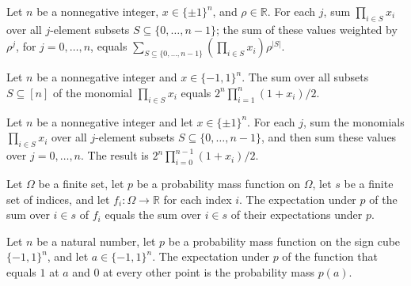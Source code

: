 \begin{theorem}
\label{FABL.sum_krawtchoukValue_mul_pow}
\leanok
{}
Let $n$ be a nonnegative integer, $x\in\{\pm1\}^n$, and $\rho\in\mathbb R$. For
each $j$, sum $\prod_{i\in S}x_i$ over all $j$-element subsets
$S\subseteq\{0,\ldots,n-1\}$; the sum of these values weighted by $\rho^j$, for
$j=0,\ldots,n$, equals $\sum_{S\subseteq\{0,\ldots,n-1\}}\left(\prod_{i\in
S}x_i\right)\rho^{|S|}$.
\end{theorem}

\begin{theorem}
\label{FABL.sum_monomial_eq_point_indicator}
\leanok
{}
Let $n$ be a nonnegative integer and $x\in\{-1,1\}^n$. The sum over all subsets
$S\subseteq[n]$ of the monomial $\prod_{i\in S}x_i$ equals $2^n\prod_{i=1}^n(1+x_i)/2$.
\end{theorem}

\begin{theorem}
\label{FABL.sum_krawtchoukValue}
\leanok
{}
Let $n$ be a nonnegative integer and let $x\in\{\pm1\}^n$. For each $j$, sum the
monomials $\prod_{i\in S}x_i$ over all $j$-element subsets
$S\subseteq\{0,\ldots,n-1\}$, and then sum these values over $j=0,\ldots,n$. The
result is $2^n\prod_{i=0}^{n-1}(1+x_i)/2$.
\end{theorem}

\begin{theorem}
\label{FABL.pmfExpectation_finset_sum}
\leanok
{}
Let $\Omega$ be a finite set, let $p$ be a probability mass function on $\Omega$, let
$s$ be a finite set of indices, and let $f_i:\Omega\to\mathbb{R}$ for each index $i$.
The expectation under $p$ of the sum over $i\in s$ of $f_i$ equals the sum over $i\in s$
of their expectations under $p$.
\end{theorem}

\begin{theorem}
\label{FABL.pmfExpectation_point_indicator}
\leanok
{}
Let $n$ be a natural number, let $p$ be a probability mass function on the sign cube
$\{-1,1\}^n$, and let $a\in\{-1,1\}^n$. The expectation under $p$ of the function that
equals $1$ at $a$ and $0$ at every other point is the probability mass $p(a)$.
\end{theorem}

